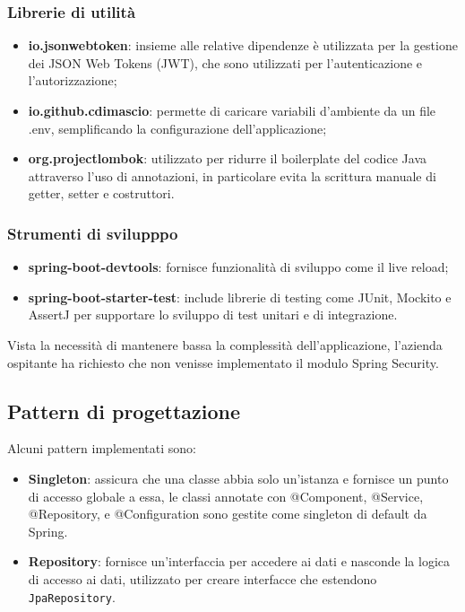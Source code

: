 \subsubsection*{Librerie di utilità}
\begin{itemize}
    \item \textbf{io.jsonwebtoken}: insieme alle relative dipendenze è utilizzata per la gestione dei JSON Web Tokens (JWT), che sono utilizzati per l'autenticazione e l'autorizzazione;
    \item \textbf{io.github.cdimascio}: permette di caricare variabili d'ambiente da un file .env, semplificando la configurazione dell'applicazione;
    \item \textbf{org.projectlombok}: utilizzato per ridurre il boilerplate del codice Java attraverso l'uso di annotazioni, in particolare evita la scrittura manuale di getter, setter e costruttori.
\end{itemize}

\subsubsection*{Strumenti di svilupppo}
\begin{itemize}
    \item \textbf{spring-boot-devtools}: fornisce funzionalità di sviluppo come il live reload;
    \item \textbf{spring-boot-starter-test}: include librerie di testing come JUnit, Mockito e AssertJ per supportare lo sviluppo di test unitari e di integrazione.
\end{itemize}

Vista la necessità di mantenere bassa la complessità dell'applicazione, l'azienda ospitante ha richiesto che non venisse implementato il modulo Spring Security.

\subsection{Pattern di progettazione}
Alcuni pattern implementati sono:
\begin{itemize}
    \item \textbf{Singleton}: assicura che una classe abbia solo un'istanza e fornisce un punto di accesso globale a essa, le classi annotate con @Component, @Service, @Repository, e @Configuration sono gestite come singleton di default da Spring.
    \item \textbf{Repository}: fornisce un'interfaccia per accedere ai dati e nasconde la logica di accesso ai dati, utilizzato per creare interfacce che estendono \texttt{JpaRepository}.
\end{itemize}



